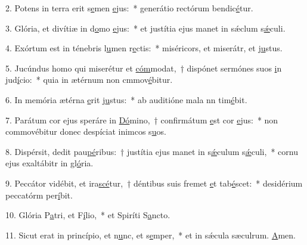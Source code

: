 2. Potens in terra erit s\uline{e}men \uline{e}jus:~* generátio rectórum bendic\uline{é}tur.\par 
3. Glória, et divítiæ in d\uline{o}mo \uline{e}jus:~* et justítia ejus manet in sǽclum s\uline{ǽ}culi.\par 
4. Exórtum est in ténebris l\uline{u}men r\uline{e}ctis:~* miséricors, et miserátr, et j\uline{u}stus.\par 
5. Jucúndus homo qui miserétur et \uline{cóm}modat,~† dispónet sermónes suos \uline{i}n jud\uline{í}cio:~* quia in ætérnum non cmmov\uline{é}bitur.\par 
6. In memória ætérna \uline{e}rit j\uline{u}stus:~* ab auditióne mala nn tim\uline{é}bit.\par 
7. Parátum cor ejus speráre in \uline{Dó}mino,~† confirmátum \uline{e}st cor \uline{e}jus:~* non commovébitur donec despíciat inimcos s\uline{u}os.\par 
8. Dispérsit, dedit pau\uline{pé}ribus:~† justítia ejus manet in s\uline{ǽ}culum s\uline{ǽ}culi,~* cornu ejus exaltábitr in gl\uline{ó}ria.\par 
9. Peccátor vidébit, et ira\uline{scé}tur,~† déntibus suis fremet \uline{e}t tab\uline{é}scet:~* desidérium peccatórm per\uline{í}bit.\par 
10. Glória P\uline{a}tri, et F\uline{í}lio,~* et Spiríti S\uline{a}ncto.\par 
11. Sicut erat in princípio, et n\uline{u}nc, et s\uline{e}mper,~* et in sǽcula sæculrum. \uline{A}men.\par 
